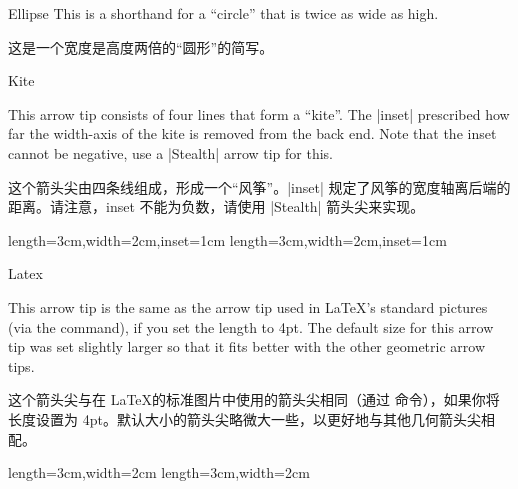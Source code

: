 \begin{arrowtipsimple}{Ellipse}
    This is a shorthand for a ``circle'' that is twice as wide as high.

    
    这是一个宽度是高度两倍的“圆形”的简写。



    \begin{arrowexamples}
        \arrowexample[]
        \arrowexampledup[sep]
        \arrowexampledupdot[sep]
        \arrowexample[open]
        \arrowexample[length=10pt]
        \arrowexample[round]
        \arrowexample[slant=.3]
        \arrowexample[left]
        \arrowexample[right]
        \arrowexample[red]
        \arrowexample[fill=red!50]
    \end{arrowexamples}
\end{arrowtipsimple}

\begin{arrowtip}{Kite}{
    This arrow tip consists of four lines that form a ``kite''. The |inset|
    prescribed how far the width-axis of the kite is removed from the back end.
    Note that the inset cannot be negative, use a |Stealth| arrow tip for this.

    这个箭头尖由四条线组成，形成一个“风筝”。|inset| 规定了风筝的宽度轴离后端的距离。请注意，inset 不能为负数，请使用 |Stealth| 箭头尖来实现。


}%
{length=3cm,width=2cm,inset=1cm}%
{length=3cm,width=2cm,inset=1cm}

    \begin{arrowexamples}
        \arrowexample[]
        \arrowexampledup[sep]
        \arrowexampledupdot[sep]
        \arrowexample[open]
        \arrowexample[length=6pt,width=4pt]
        \arrowexample[length=6pt,width=4pt,inset=1.5pt]
        \arrowexample[round]
        \arrowexample[slant=.3]
        \arrowexample[left]
        \arrowexample[right]
        \arrowexample[red]
    \end{arrowexamples}
\end{arrowtip}

\begin{arrowtip}{Latex}{
    This arrow tip is the same as the arrow tip used in \LaTeX's standard
    pictures (via the \texttt{\string\vec} command), if you set the length to
    4pt. The default size for this arrow tip was set slightly larger so that it
    fits better with the other geometric arrow tips.

    这个箭头尖与在 \LaTeX 的标准图片中使用的箭头尖相同（通过 \texttt{\string\vec} 命令），如果你将长度设置为 4pt。默认大小的箭头尖略微大一些，以更好地与其他几何箭头尖相配。


}%
{length=3cm,width=2cm}%
{length=3cm,width=2cm}

    \begin{arrowexamples}
        \arrowexample[]
        \arrowexampledup[sep]
        \arrowexampledupdot[sep]
        \arrowexample[open]
        \arrowexample[length=4pt]
        \arrowexample[round]
        \arrowexample[slant=.3]
        \arrowexample[left]
        \arrowexample[right]
        \arrowexample[red]
    \end{arrowexamples}
\end{arrowtip}

